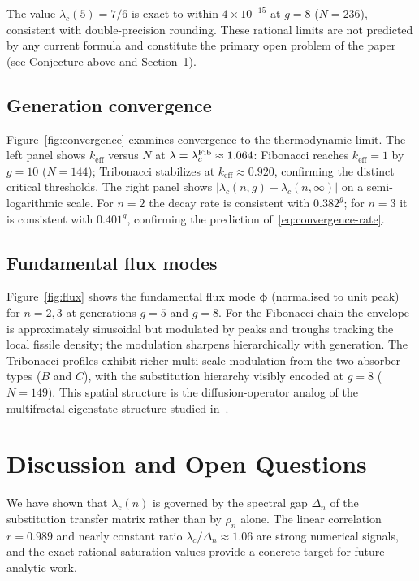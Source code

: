 \documentclass[11pt]{article}
\newcommand{\keff}{k_{\mathrm{eff}}}
\newcommand{\lc}{\lambda_c}
\newcommand{\rhon}{\rho_n}
\begin{document}
The value $\lc(5) = 7/6$ is exact to within $4 \times 10^{-15}$ at
$g=8$ ($N=236$), consistent with double-precision rounding.
These rational limits are not predicted by any current formula and
constitute the primary open problem of the paper (see Conjecture above
and Section~\ref{sec:discussion}).

\subsection{Generation convergence}
\label{sec:convergence}

Figure~\ref{fig:convergence} examines convergence to the thermodynamic limit.
The left panel shows $\keff$ versus $N$ at $\lambda = \lc^{\rm Fib} \approx 1.064$:
Fibonacci reaches $\keff=1$ by $g=10$ ($N=144$); Tribonacci stabilizes at
$\keff \approx 0.920$, confirming the distinct critical thresholds.
The right panel shows $|\lc(n,g) - \lc(n,\infty)|$ on a semi-logarithmic scale.
For $n=2$ the decay rate is consistent with $0.382^g$; for $n=3$ it is
consistent with $0.401^g$, confirming the prediction of~\eqref{eq:convergence-rate}.

\subsection{Fundamental flux modes}
\label{sec:flux-results}

Figure~\ref{fig:flux} shows the fundamental flux mode $\boldsymbol{\phi}$
(normalised to unit peak) for $n=2,3$ at generations $g=5$ and $g=8$.
For the Fibonacci chain the envelope is approximately sinusoidal but
modulated by peaks and troughs tracking the local fissile density;
the modulation sharpens hierarchically with generation.
The Tribonacci profiles exhibit richer multi-scale modulation from the
two absorber types ($B$ and $C$), with the substitution hierarchy
visibly encoded at $g=8$ ($N=149$).
This spatial structure is the diffusion-operator analog of the multifractal
eigenstate structure studied in~\cite{Krebbekx2023,Mace2016}.

\section{Discussion and Open Questions}
\label{sec:discussion}

We have shown that $\lc(n)$ is governed by the spectral gap $\Delta_n$
of the substitution transfer matrix rather than by $\rhon$ alone.
The linear correlation $r = 0.989$ and nearly constant ratio
$\lc/\Delta_n \approx 1.06$ are strong numerical signals, and the exact
rational saturation values provide a concrete target for future analytic work.
\end{document}
